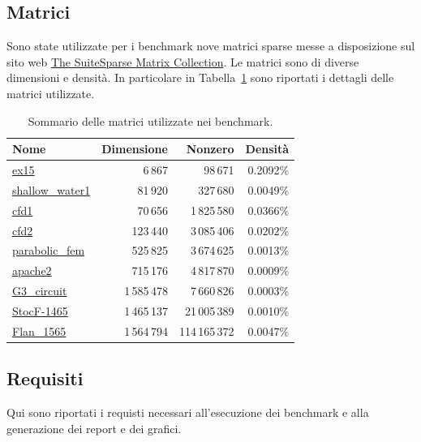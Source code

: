 \documentclass[a4paper, 12pt]{article}
\begin{document}
\subsection{Matrici}
Sono state utilizzate per i benchmark nove matrici sparse messe a disposizione
sul sito web \href{https://sparse.tamu.edu/}{The SuiteSparse Matrix Collection}.
Le matrici sono di diverse dimensioni e densità. In particolare in
Tabella~\ref{tab:matrices} sono riportati i dettagli delle matrici utilizzate.

\begin{table}[ht]
\centering

\begin{tabular}{@{}lrrr@{}}
\toprule
\textbf{Nome}
& \textbf{Dimensione} & \textbf{Nonzero} & \textbf{Densità} \\
\midrule
\href{https://sparse.tamu.edu/FIDAP/ex15}{ex15}
& 6\,867         & 98\,671          & 0.2092\%         \\
\href{https://sparse.tamu.edu/MaxPlanck/shallow_water1}{shallow\_water1}
& 81\,920        & 327\,680         & 0.0049\%         \\
\href{https://sparse.tamu.edu/Rothberg/cfd1}{cfd1}
& 70\,656        & 1\,825\,580      & 0.0366\%         \\
\href{https://sparse.tamu.edu/Rothberg/cfd2}{cfd2}
& 123\,440       & 3\,085\,406      & 0.0202\%         \\
\href{https://sparse.tamu.edu/Wissgott/parabolic_fem}{parabolic\_fem}
& 525\,825       & 3\,674\,625      & 0.0013\%         \\
\href{https://sparse.tamu.edu/GHS_psdef/apache2}{apache2}
& 715\,176       & 4\,817\,870      & 0.0009\%         \\
\href{https://sparse.tamu.edu/AMD/G3_circuit}{G3\_circuit}
& 1\,585\,478    & 7\,660\,826      & 0.0003\%         \\
\href{https://sparse.tamu.edu/Janna/StocF-1465}{StocF-1465}
& 1\,465\,137    & 21\,005\,389     & 0.0010\%         \\
\href{https://sparse.tamu.edu/Janna/Flan_1565}{Flan\_1565}
& 1\,564\,794    & 114\,165\,372    & 0.0047\%         \\
\bottomrule
\end{tabular}%

\caption{Sommario delle matrici utilizzate nei benchmark.}
\label{tab:matrices}
\end{table}

\subsection{Requisiti}
Qui sono riportati i requisti necessari all'esecuzione dei benchmark e alla
generazione dei report e dei grafici.
\end{document}
